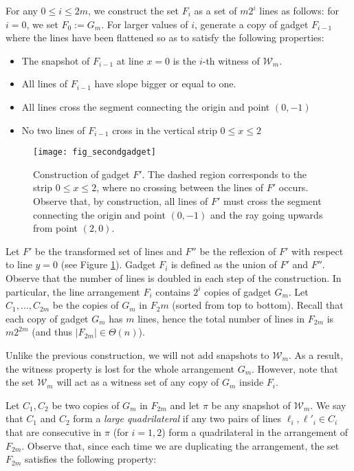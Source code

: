 \documentclass[11pt,a4paper]{article}
\begin{document}
For any $0\leq i\leq 2m$, we construct the set $F_i$ as a set of $m2^i$ lines as follows: for $i=0$, we set $F_0:=G_m$. For larger values of $i$, generate a copy of gadget $F_{i-1}$ where the lines have been flattened so as to satisfy the following properties:
\begin{itemize}
\item The snapshot of $F_{i-1}$ at line $x=0$ is the $i$-th witness of $\mathcal{W}_m$.
\item All lines of $F_{i-1}$ have slope bigger or equal to one.
\item All lines cross the segment connecting the origin and point $(0,-1)$
\item No two lines of $F_{i-1}$ cross in the vertical strip $0\leq x\leq 2$
\end{itemize}
\begin{figure}
   \begin{center}
     \texttt{[image: fig\_secondgadget]}
     \caption{Construction of gadget $F'$. The dashed region corresponds to the strip $0\leq x\leq 2$, where no crossing between the lines of $F'$ occurs. Observe that, by construction, all lines of $F'$ must cross the segment connecting the origin and point $(0,-1)$ and the ray going upwards from point $(2,0)$.}
     \label{Afig_secondgadget}
   \end{center}
\end{figure}

Let $F'$ be the transformed set of lines and $F''$ be the reflexion of $F'$ with respect to line $y=0$ (see Figure \ref{Afig_secondgadget}). Gadget $F_{i}$ is defined as the union of $F'$ and $F''$. Observe that the number of lines is doubled in each step of the construction. In particular,  the line arrangement $F_i$ contains $2^{i}$ copies of gadget $G_m$. Let $C_1, \ldots, C_{2m}$ be the copies of $G_m$ in $F_2m$ (sorted from top to bottom). Recall that each copy of gadget $G_m$ has $m$ lines, hence the total number of lines in $F_{2m}$ is $m2^{2m}$ (and thus $|F_{2m}|\in \Theta(n)$).

Unlike the previous construction, we will not add snapshots to $\mathcal{W}_m$. As a result, the witness property is lost for the whole arrangement $G_m$. However, note that the set $\mathcal{W}_m$ will act as a witness set of any copy of $G_m$ inside $F_i$.

Let $C_1, C_2$ be two copies of $G_m$ in $F_{2m}$ and let $\pi$ be any snapshot of $\mathcal{W}_m$. We say that $C_1$ and $C_2$ form a {\em large quadrilateral} if any two pairs of lines $\ell_i,\ell'_i\in C_i$ that are consecutive in $\pi$ (for $i=1,2$) form a quadrilateral in the arrangement of $F_{2m}$. Observe that, since each time we are duplicating the arrangement, the set $F_{2m}$ satisfies the following property:
\end{document}
